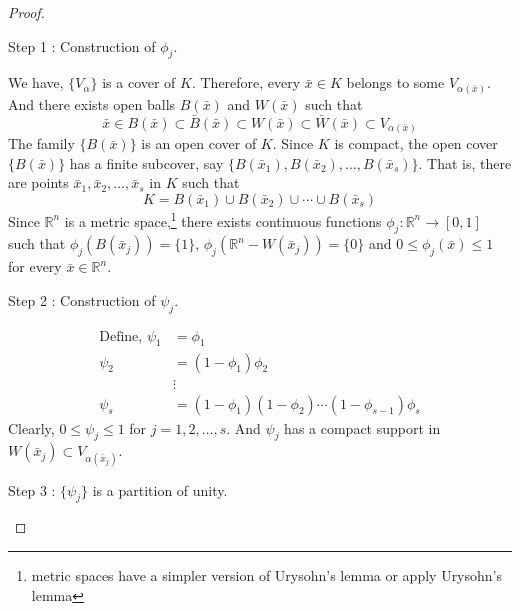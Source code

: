\begin{proof}
	\begin{commentary}
		Step 1 : Construction of $\phi_j$.
	\end{commentary}

	We have, $\{ V_\alpha \}$ is a cover of $K$.
	Therefore, every $\bar{x} \in K$ belongs to some $V_{\alpha(\bar{x})}$.
	And there exists open balls $B(\bar{x})$ and $W(\bar{x})$ such that
	\begin{equation}
		\bar{x} \in B(\bar{x}) \subset \bar{B}(\bar{x}) \subset W(\bar{x}) \subset \bar{W}(\bar{x}) \subset V_{\alpha(\bar{x})}
	\end{equation}
	The family $\{ B(\bar{x}) \}$ is an open cover of $K$.
	Since $K$ is compact, the open cover $\{ B(\bar{x}) \}$ has a finite subcover, say $\{ B(\bar{x}_1),B(\bar{x}_2),\dots,B(\bar{x}_s) \}$.
	That is, there are points $\bar{x}_1,\bar{x}_2,\dots,\bar{x}_s$ in $K$ such that
	\begin{equation}
		K = B(\bar{x}_1) \cup B(\bar{x}_2) \cup \dotsb \cup B(\bar{x}_s)
	\end{equation}
	Since $\mathbb{R}^n$ is a metric space,\footnote{metric spaces have a simpler version of Urysohn's lemma or apply Urysohn's lemma}
	there exists continuous functions $\phi_j : \mathbb{R}^n \to [0,1]$
	such that $\phi_j(B(\bar{x}_j)) = \{1\}$,
	$\phi_j(\mathbb{R}^n-W(\bar{x}_j)) = \{0\}$ and
	$0 \le \phi_j(\bar{x}) \le 1$ for every $\bar{x} \in \mathbb{R}^n$.\\
	\begin{commentary}
		Step 2 : Construction of $\psi_j$.
	\end{commentary}
	\begin{align*}
		\text{Define, } \psi_1 & = \phi_1 \\
		\psi_2 & = (1-\phi_1)\phi_2\\
		& \vdots\\
		\psi_s & = (1-\phi_1)(1-\phi_2) \dotsm (1-\phi_{s-1})\phi_s
	\end{align*}
	Clearly, $0 \le \psi_j \le 1$ for $j = 1,2,\dots,s$.
	And $\psi_j$ has a compact support in $W(\bar{x}_j) \subset V_{\alpha(\bar{x}_j)}$.\\
	\begin{commentary}
		Step 3 : $\{\psi_j\}$ is a partition of unity.
	\end{commentary}


\end{proof}
